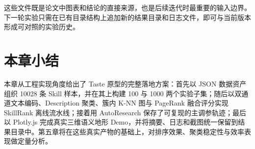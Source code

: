 这些文件既是论文中图表和结论的直接来源，也是后续迭代时最重要的输入边界。下一轮实验只需在已有目录结构上追加新的结果目录和日志文件，即可与当前版本形成可对照的实验历史。

\section{本章小结}
\label{sec:chap4_summary}

本章从工程实现角度给出了 Taste 原型的完整落地方案：首先以 JSON 数据资产组织 10028 条 Skill 样本，并在其上构建 100 与 1000 两个实验子集；随后以双通道文本编码、Description 聚类、簇内 K-NN 图与 PageRank 融合评分实现 SkillRank 离线流水线；接着用 AutoResearch 保存了可复现的主调参轨迹；最后以 Plotly.js 完成真实三维语义地形 Demo，并将摘要、日志和截图统一保留到结果目录中。第五章将在这些真实产物的基础上，对排序效果、聚类稳定性与效率表现做定量分析。
